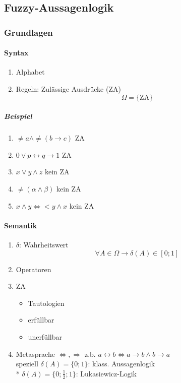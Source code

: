 \documentclass[a4paper]{scrartcl}
\begin{document}
\subsection{Fuzzy-Aussagenlogik}%
\subsubsection{Grundlagen}
\paragraph{Syntax}
\begin{enumerate}
\item Alphabet
\item Regeln: Zulässige Ausdrücke (ZA)
\[ \Omega = \{\text{ZA}\}\]
\end{enumerate}

\subparagraph{Beispiel}
\begin{enumerate}
\item $\neq a \wedge \neq (b \rightarrow c)$ ZA
\item $0 \vee p \leftrightarrow q \rightarrow 1$ ZA
\item $ x \vee y \wedge z$ kein ZA
\item $\neq (\alpha \wedge \beta)$ kein ZA
\item $x \wedge y \Leftrightarrow < y \wedge x$ kein ZA
\end{enumerate}

\paragraph{Semantik}
\begin{enumerate}
\item $\delta$: Wahrheitswert
\[ \forall A \in \Omega \rightarrow \delta (A) \in [0;1]\]
\item Operatoren
\item ZA
	\begin{itemize}
	\item Tautologien
	\item erfüllbar
	\item unerfüllbar
	\end{itemize}
\item Metasprache $\Leftrightarrow, \Rightarrow$ z.b. $a \leftrightarrow b \Leftrightarrow a \rightarrow b \wedge b \rightarrow a$ \\
speziell $\delta (A) = \{ 0;1\}$: klass. Aussagenlogik\\*
$\delta (A) = \{ 0;\frac{1}{2}; 1\}$: Lukasiewicz-Logik
\end{enumerate}
\end{document}
